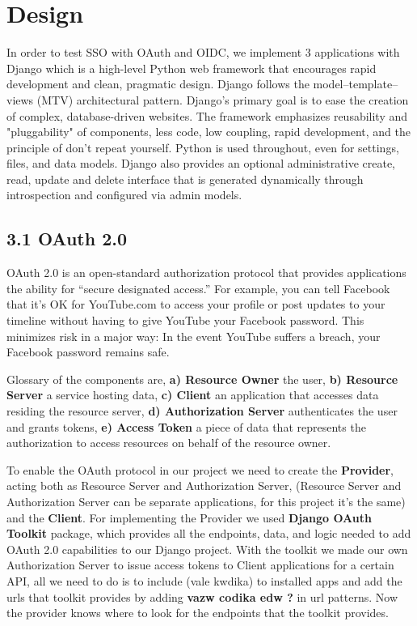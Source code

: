 \section{Design}

In order to test SSO with OAuth and OIDC, we implement 3 applications with Django which is a high-level Python web framework that encourages rapid development and clean, pragmatic design. Django follows the model–template–views (MTV) architectural pattern. Django's primary goal is to ease the creation of complex, database-driven websites. The framework emphasizes reusability and "pluggability" of components, less code, low coupling, rapid development, and the principle of don't repeat yourself. Python is used throughout, even for settings, files, and data models. Django also provides an optional administrative create, read, update and delete interface that is generated dynamically through introspection and configured via admin models.

   

\subsection*{3.1 OAuth 2.0}

OAuth 2.0 is an open-standard authorization protocol that provides applications the ability for “secure designated access.” For example, you can tell Facebook that it’s OK for YouTube.com to access your profile or post updates to your timeline without having to give YouTube your Facebook password. This minimizes risk in a major way: In the event YouTube suffers a breach, your Facebook password remains safe.


Glossary of the components are, \textbf{a) Resource Owner} the user, \textbf{b) Resource Server} a service hosting data, \textbf{c) Client} an application that accesses data residing the resource server, \textbf{d) Authorization Server} authenticates the user and grants tokens, \textbf{e) Access Token} a piece of data that represents the authorization to access resources on behalf of the resource owner.


To enable the OAuth protocol in our project we need to create the \textbf{Provider}, acting both as Resource Server and Authorization Server, (Resource Server and Authorization Server can be separate applications, for this project it's the same) and the \textbf{Client}.
For implementing the Provider we used \textbf{Django OAuth Toolkit} package, which provides all the endpoints, data, and logic needed to add OAuth 2.0 capabilities to our Django project.
With the toolkit we made our own Authorization Server to issue access tokens to Client applications for a certain API, all we need to do is to include (vale kwdika) to installed apps and add the urls that toolkit provides by adding  \textbf{vazw codika edw ?} in url patterns. Now the provider knows where to look for the endpoints that the toolkit provides.

